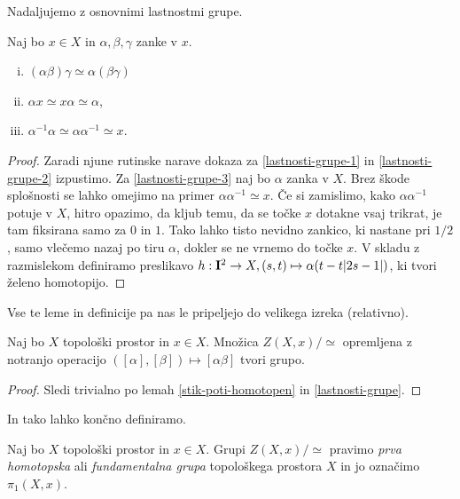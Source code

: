 \documentclass[11pt, a4paper]{article}
\begin{document}
Nadaljujemo z osnovnimi lastnostmi grupe.


\begin{lema} Naj bo $x \in X$ in $\alpha, \beta, \gamma$ zanke v $x$.
    \begin{enumerate}[(i)]
        \item \label{lastnosti-grupe-1} $(\alpha\beta)\gamma \simeq \alpha(\beta\gamma)$
        \item \label{lastnosti-grupe-2} $\alpha x \simeq x \alpha \simeq \alpha$,
        \item \label{lastnosti-grupe-3} $\alpha^{-1}\alpha \simeq \alpha\alpha^{-1} \simeq x$.
    \end{enumerate}
    \label{lastnosti-grupe}
\end{lema}


\begin{proof}
    Zaradi njune rutinske narave dokaza za \eqref{lastnosti-grupe-1} in \eqref{lastnosti-grupe-2} izpustimo. Za \eqref{lastnosti-grupe-3} naj bo $\alpha$ zanka v $X$. Brez škode splošnosti se lahko omejimo na primer $\alpha\alpha^{-1} \simeq x$. Če si zamislimo, kako $\alpha\alpha^{-1}$ potuje v $X$, hitro opazimo, da kljub temu, da se točke $x$ dotakne vsaj trikrat, je tam fiksirana samo za $0$ in $1$. Tako lahko tisto nevidno zankico, ki nastane pri $1 / 2$, samo vlečemo nazaj po tiru $\alpha$, dokler se ne vrnemo do točke $x$. V skladu z razmislekom definiramo preslikavo $h : \mathbf{I}^2 \to X, (s, t) \mapsto \alpha(t - t|2s - 1|)$, ki tvori želeno homotopijo.
\end{proof}


Vse te leme in definicije pa nas le pripeljejo do velikega izreka (relativno).


\begin{izrek}
    Naj bo $X$ topološki prostor in $x \in X$. Množica $Z(X, x) / \!\!\simeq$ opremljena z notranjo operacijo $([\alpha], [\beta]) \mapsto [\alpha\beta]$ tvori grupo.
\end{izrek}


\begin{proof}
    Sledi trivialno po lemah \ref{stik-poti-homotopen} in \ref{lastnosti-grupe}.
\end{proof}


In tako lahko končno definiramo.


\begin{definicija}
    Naj bo $X$ topološki prostor in $x \in X$. Grupi $Z(X, x) / \!\!\simeq$ pravimo \textit{prva homotopska} ali \textit{fundamentalna grupa} topološkega prostora $X$ in jo označimo $\pi_1(X, x)$.
\end{definicija}
\end{document}

